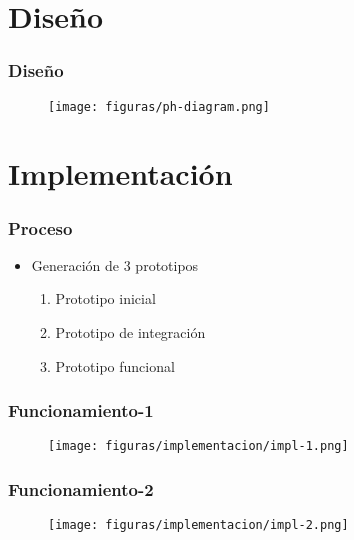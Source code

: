 \documentclass{beamer}
\begin{document}
\section{Diseño}

\begin{frame}[plain]
    \frametitle{Diseño}
    \begin{figure}[H]
        \centerline{\texttt{[image: figuras/ph-diagram.png]}}
        \label{fig:ph-diagram}
    \end{figure}
\end{frame}

\section{Implementación}

\begin{frame}{}
    \frametitle{Proceso}
    \begin{itemize}
        \item Generación de 3 prototipos \pause
        \begin{enumerate}
            \item Prototipo inicial \pause
            \item Prototipo de integración \pause
            \item Prototipo funcional
        \end{enumerate}
    \end{itemize}
\end{frame}

\begin{frame}{}
    \frametitle{Funcionamiento-1}
    \begin{figure}[H]
        \centerline{\texttt{[image: figuras/implementacion/impl-1.png]}}
    \end{figure}
\end{frame}

\begin{frame}{}
    \frametitle{Funcionamiento-2}
    \begin{figure}[H]
        \centerline{\texttt{[image: figuras/implementacion/impl-2.png]}}
    \end{figure}
\end{frame}
\end{document}
